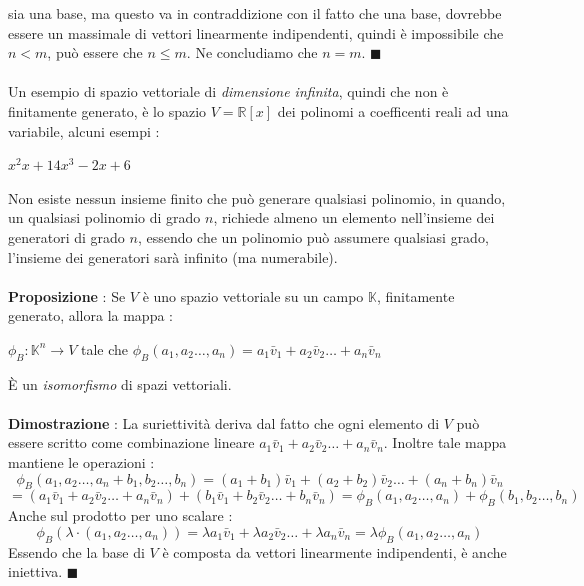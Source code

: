 \documentclass[12pt, letterpaper]{article}
\newcommand{\R}{{\mathbb R}}
\newcommand{\ve}{{\bar v}}
\newcommand{\acc}{\\\hphantom{}\\}
\begin{document}
sia una base, ma questo va in contraddizione con il fatto che una base, dovrebbe essere 
un massimale di vettori linearmente indipendenti, quindi è impossibile che \(n<m\), può essere che 
\(n\le m\). Ne concludiamo che \(n=m\). \(\blacksquare\)\acc 
Un esempio di spazio vettoriale di \textit{dimensione infinita}, quindi che non è 
finitamente generato, è lo spazio \(V=\R[x]\) dei polinomi a coefficenti reali ad una variabile, alcuni esempi : \begin{center}
    \(x^2\)\hphantom{text}\(x+1\)\hphantom{text}\(4x^3-2x+6\)\hphantom{text}
\end{center}
Non esiste nessun insieme finito che può generare qualsiasi polinomio, in quando, un qualsiasi 
polinomio di grado \(n\), richiede almeno un elemento nell'insieme dei generatori di grado \(n\), 
essendo che un polinomio può assumere qualsiasi grado, l'insieme dei generatori 
sarà infinito (ma numerabile).\acc 
\textbf{Proposizione }: Se \(V\) è uno spazio vettoriale su un campo \(\mathbb{K}\), finitamente 
generato, allora la mappa : \begin{center}
    \(\phi_B : \mathbb{K}^n\rightarrow V\) tale che \(\phi_B(a_1,a_2\dots,a_n)=a_1\ve_1+a_2\ve_2\dots+a_n\ve_n\)
\end{center}
È un  \textit{isomorfismo} di spazi vettoriali.\acc 
\textbf{Dimostrazione }: La suriettività deriva dal fatto che ogni elemento di \(V\) può essere scritto 
come combinazione lineare \(a_1\ve_1+a_2\ve_2\dots+a_n\ve_n\). Inoltre tale mappa mantiene le operazioni : \begin{equation}
    \phi_B(a_1,a_2\dots,a_n+b_1,b_2\dots,b_n)=(a_1+b_1)\ve_1+(a_2+b_2)\ve_2\dots+(a_n+b_n)\ve_n
\end{equation}\begin{equation}
    =(a_1\ve_1+a_2\ve_2\dots+a_n\ve_n)+(b_1\ve_1+b_2\ve_2\dots+b_n\ve_n)=\phi_B(a_1,a_2\dots,a_n)+\phi_B(b_1,b_2\dots,b_n)
\end{equation}
Anche sul prodotto per uno scalare : \begin{equation}
    \phi_B(\lambda\cdot(a_1,a_2\dots,a_n))=\lambda a_1\ve_1+\lambda a_2\ve_2\dots+\lambda a_n\ve_n=\lambda\phi_B(a_1,a_2\dots,a_n)
\end{equation}
Essendo che la base di \(V\) è composta da vettori linearmente indipendenti, è anche iniettiva. \(\blacksquare\)
\end{document}

